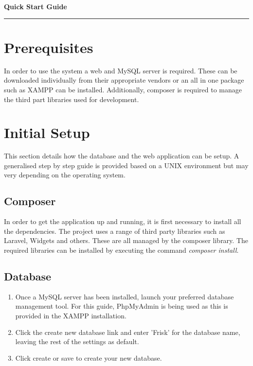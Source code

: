 \documentclass[12pt]{article}
\begin{document}
\begin{center}
	\textbf{\Huge Quick Start Guide}
\end{center}
\vspace{.2cm}
\hrule

\tableofcontents
\newpage
{}

\section{Prerequisites}
In order to use the system a web and MySQL server is required. These can be downloaded individually from their appropriate vendors or an all in one package such as XAMPP can be installed. Additionally, composer is required to manage the third part libraries used for development.

\section{Initial Setup}
This section details how the database and the web application can be setup. A generalised step by step guide is provided based on a UNIX environment but may very depending on the operating system.

\subsection{Composer}
In order to get the application up and running, it is first necessary to install all the dependencies. The project uses a range of third party libraries such as Laravel, Widgets and others. These are all managed by the composer library. The required libraries can be installed by executing the command \textit{composer install}.

\subsection{Database}
\begin{enumerate}
	\item Once a MySQL server has been installed, launch your preferred  database management tool. For this guide, PhpMyAdmin is being used as this is provided in the XAMPP installation.
	\item Click the create new database link and enter 'Frisk' for the database name, leaving the rest of the settings as default.
	\item Click create or save to create your new database.
\end{enumerate}
\end{document}
